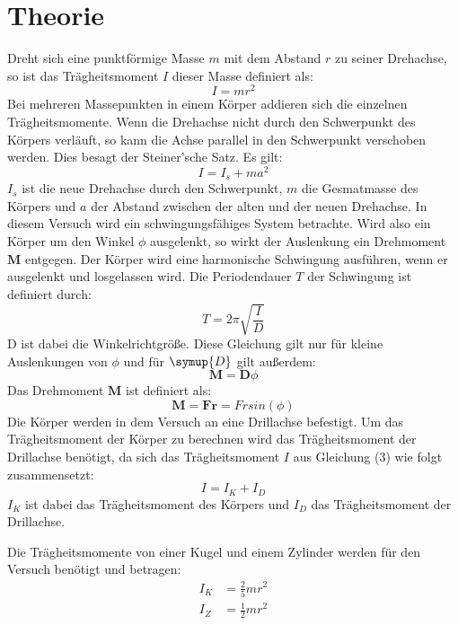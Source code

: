 \section{Theorie}
\label{sec:Theorie}

\cite{sample}
Dreht sich eine punktförmige Masse $m$ mit dem Abstand $r$ zu seiner Drehachse, so
ist das Trägheitsmoment $I$ dieser Masse definiert als:
\begin{equation}
  I = m r^2
\end{equation}
Bei mehreren Massepunkten in einem Körper addieren sich die einzelnen
Trägheitsmomente.
Wenn die Drehachse nicht durch den Schwerpunkt des Körpers verläuft, so kann
die Achse parallel in den Schwerpunkt verschoben werden. Dies besagt der Steiner'sche
Satz. Es gilt:
\begin{equation}
  I = I_s + m a^2
\end{equation}
$I_s$ ist die neue Drehachse durch den Schwerpunkt, $m$ die Gesmatmasse
des Körpers und $a$ der Abstand zwischen der alten und der neuen Drehachse.
In diesem Versuch wird ein schwingungsfähiges System betrachte. Wird also ein Körper
um den Winkel $\phi$ ausgelenkt, so wirkt der Auslenkung ein Drehmoment $\symbf{M}$ entgegen.
Der Körper wird eine harmonische Schwingung ausführen, wenn er ausgelenkt und
losgelassen wird. Die Periodendauer $T$ der Schwingung ist definiert durch:
\begin{equation}
  T = 2 \pi \sqrt{\frac{I}{D}}
\end{equation}
D ist dabei die Winkelrichtgröße. Diese Gleichung gilt nur für
kleine Auslenkungen von $\phi$ und für $\symup{D}$ gilt außerdem:
\begin{equation}
  \symbf{M} = \symbf{D} \phi
\end{equation}
Das Drehmoment $\symbf{M}$ ist definiert als:
\begin{equation}
  \symbf{M} = \symbf{F}{\symbf{r}} = F r sin(\phi)
\end{equation}
Die Körper werden in dem Versuch an eine Drillachse befestigt. Um das Trägheitsmoment
der Körper zu berechnen wird das Trägheitsmoment der Drillachse benötigt, da sich
das Trägheitsmoment $I$ aus Gleichung (3) wie folgt zusammensetzt:
\begin{equation}
  I = I_K + I_D
\end{equation}
$I_K$ ist dabei das Trägheitsmoment des Körpers und $I_D$ das
Trägheitsmoment der Drill\-achse.

Die Trägheitsmomente von einer Kugel und einem Zylinder werden für den Versuch benötigt
und betragen:
\begin{align}
  I_K &= \frac{2}{5}mr^2 \\
  I_Z &= \frac{1}{2}mr^2
\end{align}

